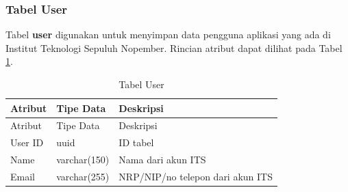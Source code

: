 \subsubsection{Tabel User}
\par Tabel \textbf{user} digunakan untuk menyimpan data pengguna aplikasi yang ada di Institut Teknologi Sepuluh Nopember. Rincian atribut dapat dilihat pada Tabel \ref{tabel_user}.
\begin{longtable}{|p{2cm}|p{2.5cm}|p{4.5cm}|}
 	\caption{Tabel User} \label{tabel_user} \\ \hline
    \rowcolor{lightgray} {Atribut} & {Tipe Data} & {Deskripsi} \\ \hline
    \endfirsthead
    \hline
    \rowcolor{lightgray} {Atribut} & {Tipe Data} & {Deskripsi} \\ \hline
    \endhead
    User ID & uuid & ID tabel \\ \hline
    Name & varchar(150) & Nama dari akun ITS \\ \hline
    Email & varchar(255) & NRP/NIP/no telepon dari akun ITS \\ \hline

\end{longtable}
